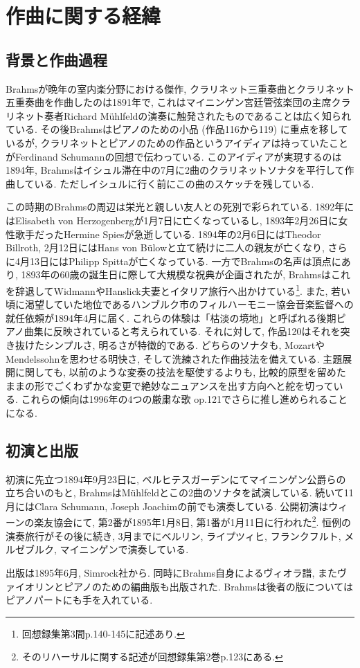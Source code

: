 
\chapter{作曲に関する経緯}

\section{背景と作曲過程}

Brahmsが晩年の室内楽分野における傑作, クラリネット三重奏曲とクラリネット五重奏曲を作曲したのは1891年で,
これはマイニンゲン宮廷管弦楽団の主席クラリネット奏者Richard Mühlfeldの演奏に触発されたものであることは広く知られている.
その後Brahmsはピアノのための小品 (作品116から119) に重点を移しているが,
クラリネットとピアノのための作品というアイディアは持っていたことがFerdinand Schumannの回想で伝わっている\cite{library}.
このアイディアが実現するのは1894年, Brahmsはイシュル滞在中の7月に2曲のクラリネットソナタを平行して作曲している\cite{compos}.
ただしイシュルに行く前にこの曲のスケッチを残している\cite{library}.

この時期のBrahmsの周辺は栄光と親しい友人との死別で彩られている.
1892年にはElisabeth von Herzogenbergが1月7日に亡くなっているし, 1893年2月26日に女性歌手だったHermine Spiesが急逝している.
1894年の2月6日にはTheodor Billroth, 2月12日にはHans von Bülowと立て続けに二人の親友が亡くなり, さらに4月13日にはPhilipp Spittaが亡くなっている.
一方でBrahmsの名声は頂点にあり, 1893年の60歳の誕生日に際して大規模な祝典が企画されたが,
Brahmsはこれを辞退してWidmannやHanslick夫妻とイタリア旅行へ出かけている\footnote{回想録集第3間p.140-145に記述あり.}.
また, 若い頃に渇望していた地位であるハンブルク市のフィルハーモニー協会音楽監督への就任依頼が1894年4月に届く.
これらの体験は「枯淡の境地」と呼ばれる後期ピアノ曲集に反映されていると考えられている.
それに対して, 作品120はそれを突き抜けたシンプルさ, 明るさが特徴的である.
どちらのソナタも, MozartやMendelssohnを思わせる明快さ, そして洗練された作曲技法を備えている.
主題展開に関しても, 以前のような変奏の技法を駆使するよりも,
比較的原型を留めたままの形でごくわずかな変更で絶妙なニュアンスを出す方向へと舵を切っている.
これらの傾向は1996年の4つの厳粛な歌 op.121でさらに推し進められることになる.


\section{初演と出版}

初演に先立つ1894年9月23日に, ベルヒテスガーデンにてマイニンゲン公爵らの立ち合いのもと, BrahmsはMühlfeldとこの2曲のソナタを試演している\cite{compos}.
続いて11月にはClara Schumann, Joseph Joachimの前でも演奏している\cite{henle}.
公開初演はウィーンの楽友協会にて, 第2番が1895年1月8日, 第1番が1月11日に行われた\footnote{そのリハーサルに関する記述が回想録集第2巻p.123にある.}\cite{library}.
恒例の演奏旅行がその後に続き, 3月までにベルリン, ライプツィヒ, フランクフルト, メルゼブルク, マイニンゲンで演奏している\cite{compos}.


出版は1895年6月, Simrock社から. 同時にBrahms自身によるヴィオラ譜, またヴァイオリンとピアノのための編曲版も出版された\cite{imslp}.
Brahmsは後者の版についてはピアノパートにも手を入れている.
